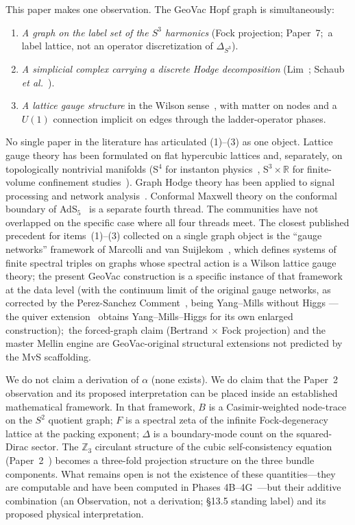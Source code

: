 \documentclass[aps,pra,twocolumn,superscriptaddress,longbibliography]{revtex4-2}
\begin{document}
This paper makes one observation.  The GeoVac Hopf graph is
simultaneously:
\begin{enumerate}
\item \emph{A graph on the label set of the $S^3$ harmonics} (Fock projection; Paper~7;\ a label lattice, not an operator discretization of $\Delta_{S^3}$).
\item \emph{A simplicial complex carrying a discrete Hodge
  decomposition} (Lim~\cite{Lim2020}; Schaub \emph{et
  al.}~\cite{Schaub2020}).
\item \emph{A lattice gauge structure} in the Wilson
  sense~\cite{Wilson1974}, with matter on nodes and a $U(1)$
  connection implicit on edges through the ladder-operator phases.
\end{enumerate}
No single paper in the literature has articulated (1)--(3) as one
object.  Lattice gauge theory has been formulated on flat hypercubic
lattices and, separately, on topologically nontrivial manifolds (S\({}^4\) for
instanton physics~\cite{BergLuscher1981,Luscher1982}, S\({}^3 \times
\mathbb{R}\) for finite-volume confinement
studies~\cite{Aharony2004}).  Graph Hodge theory has been applied to
signal processing and network analysis~\cite{Lim2020,Schaub2020}.
Conformal Maxwell theory on the conformal boundary of
AdS$_5$~\cite{EastwoodSinger1985,Maldacena1998} is a separate fourth
thread.  The communities have not overlapped on the specific case
where all four threads meet.  The closest published precedent for
items~(1)--(3) collected on a single graph object is the
``gauge networks'' framework of Marcolli and van
Suijlekom~\cite{MarcolliVanSuijlekom2014}, which defines systems of
finite spectral triples on graphs whose spectral action is a Wilson
lattice gauge theory; the present GeoVac construction is a specific
instance of that framework at the data level (with the continuum
limit of the original gauge networks, as corrected by the
Perez-Sanchez Comment~\cite{PerezSanchez2025Comment},
being Yang--Mills without Higgs --- the quiver
extension~\cite{PerezSanchez2024} obtains Yang--Mills--Higgs for its
own enlarged construction);\ the forced-graph claim
(Bertrand $\times$ Fock projection) and the master Mellin engine
are GeoVac-original structural extensions not predicted by the MvS
scaffolding.

We do not claim a derivation of $\alpha$ (none exists).  We do claim that the
Paper~2 observation and its proposed interpretation can be placed
inside an established mathematical framework.  In that framework, $B$ is a Casimir-weighted node-trace
on the $S^2$ quotient graph; $F$ is a spectral zeta of the infinite
Fock-degeneracy lattice at the packing exponent; $\Delta$ is a
boundary-mode count on the squared-Dirac sector.  The $\mathbb{Z}_3$
circulant structure of the cubic self-consistency equation
(Paper~2~\cite{Paper2}) becomes a three-fold projection structure on
the three bundle components.  What remains open is not the
existence of these quantities---they are computable and have been
computed in Phases 4B--4G~\cite{Paper2}---but their additive
combination (an Observation, not a derivation; \S 13.5 standing
label) and its proposed physical interpretation.
\end{document}
